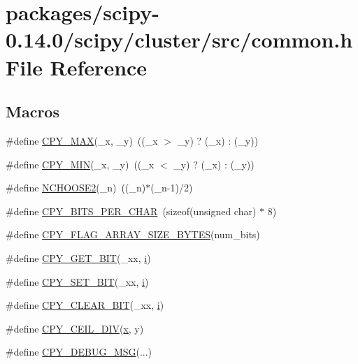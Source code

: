 \hypertarget{scipy-0_814_80_2scipy_2cluster_2src_2common_8h}{}\section{packages/scipy-\/0.14.0/scipy/cluster/src/common.h File Reference}
\label{scipy-0_814_80_2scipy_2cluster_2src_2common_8h}
\subsection*{Macros}
\begin{DoxyCompactItemize}
\item 
\#define \hyperlink{scipy-0_814_80_2scipy_2cluster_2src_2common_8h_a9711354dd174700495172b2704e15264}{C\+P\+Y\+\_\+\+M\+A\+X}(\+\_\+x,  \+\_\+y)~((\+\_\+x $>$ \+\_\+y) ? (\+\_\+x) \+: (\+\_\+y))
\item 
\#define \hyperlink{scipy-0_814_80_2scipy_2cluster_2src_2common_8h_a854cb1cc38fe7c993ba776d0abf73c0a}{C\+P\+Y\+\_\+\+M\+I\+N}(\+\_\+x,  \+\_\+y)~((\+\_\+x $<$ \+\_\+y) ? (\+\_\+x) \+: (\+\_\+y))
\item 
\#define \hyperlink{scipy-0_814_80_2scipy_2cluster_2src_2common_8h_abb718fbcba05766b98797bc0c8679392}{N\+C\+H\+O\+O\+S\+E2}(\+\_\+n)~((\+\_\+n)$\ast$(\+\_\+n-\/1)/2)
\item 
\#define \hyperlink{scipy-0_814_80_2scipy_2cluster_2src_2common_8h_a8e59f30d1b6f8530e3583cb8ceea23e6}{C\+P\+Y\+\_\+\+B\+I\+T\+S\+\_\+\+P\+E\+R\+\_\+\+C\+H\+A\+R}~(sizeof(unsigned char) $\ast$ 8)
\item 
\#define \hyperlink{scipy-0_814_80_2scipy_2cluster_2src_2common_8h_a79af9b0841bc1859896cfb0d7decc7ab}{C\+P\+Y\+\_\+\+F\+L\+A\+G\+\_\+\+A\+R\+R\+A\+Y\+\_\+\+S\+I\+Z\+E\+\_\+\+B\+Y\+T\+E\+S}(num\+\_\+bits)
\item 
\#define \hyperlink{scipy-0_814_80_2scipy_2cluster_2src_2common_8h_abbd3845f780999643f7befd2710dfa95}{C\+P\+Y\+\_\+\+G\+E\+T\+\_\+\+B\+I\+T}(\+\_\+xx,  \hyperlink{indexexpr_8h_aabd77643995707c185e95c8cb2782c81}{i})
\item 
\#define \hyperlink{scipy-0_814_80_2scipy_2cluster_2src_2common_8h_a8276cf81605493e8880428a02b7f1801}{C\+P\+Y\+\_\+\+S\+E\+T\+\_\+\+B\+I\+T}(\+\_\+xx,  \hyperlink{indexexpr_8h_aabd77643995707c185e95c8cb2782c81}{i})
\item 
\#define \hyperlink{scipy-0_814_80_2scipy_2cluster_2src_2common_8h_ab110690450f26f45b9a1592583710081}{C\+P\+Y\+\_\+\+C\+L\+E\+A\+R\+\_\+\+B\+I\+T}(\+\_\+xx,  \hyperlink{indexexpr_8h_aabd77643995707c185e95c8cb2782c81}{i})
\item 
\#define \hyperlink{scipy-0_814_80_2scipy_2cluster_2src_2common_8h_a5bc06e1af1a2b4e87d1fbab392a53caf}{C\+P\+Y\+\_\+\+C\+E\+I\+L\+\_\+\+D\+I\+V}(\hyperlink{vecnorm1_8cc_ac73eed9e41ec09d58f112f06c2d6cb63}{x},  y)
\item 
\#define \hyperlink{scipy-0_814_80_2scipy_2cluster_2src_2common_8h_adab9f9bba3002510208e9330da07c66c}{C\+P\+Y\+\_\+\+D\+E\+B\+U\+G\+\_\+\+M\+S\+G}(...)
\end{DoxyCompactItemize}



